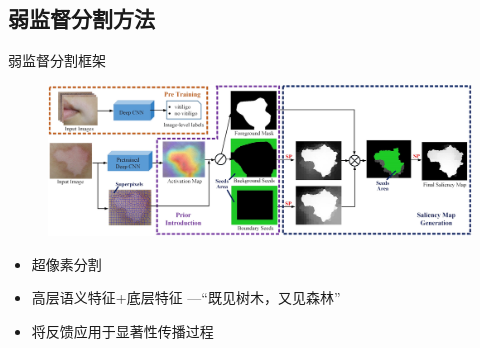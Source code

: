 \subsection{弱监督分割方法}
\begin{frame}{弱监督分割框架}
\begin{figure}
    \centering
    \includegraphics[width=\linewidth]{figures/CNNandSuperPixelModelGraph3.jpg}
\end{figure}
\vfill
\begin{itemize}
\item 超像素分割
\item 高层语义特征+底层特征 ---``既见树木，又见森林''
\item 将反馈应用于显著性传播过程
\end{itemize}
\end{frame}

